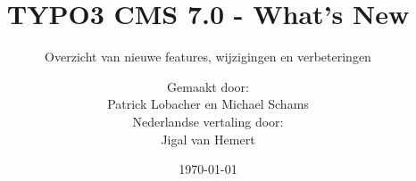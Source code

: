%

%
%

\documentclass[t]{beamer}

\beamertemplatenavigationsymbolsempty

{
	\usetheme{typo3slides}
}

\title{TYPO3 CMS 7.0 - What's New}
\subtitle{Overzicht van nieuwe features, wijzigingen en verbeteringen}
\author{
	\centerline{Gemaakt door:}
	\centerline{Patrick Lobacher en Michael Schams}
	\vspace{0.4cm}
	\centerline{Nederlandse vertaling door:}
	\centerline{Jigal van Hemert}
}

\date{\today}



\sharefont


\begingroup
	[default]
	\begin{frame}
		\titlepage
	\end{frame}
\endgroup



\section*{TYPO3 CMS 7.0 - What's New}
\begin{frame}[fragile]
	\frametitle{Inhoudsopgave}
	\framesubtitle{Inhoudsopgave}

	\begin{multicols}{2}
		\tableofcontents
	\end{multicols}

\end{frame}

